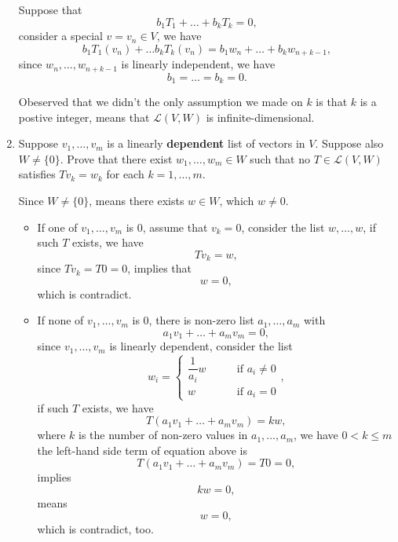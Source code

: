 \begin{enumerate}
\begin{solution}
            Suppose that 
            \[ b_1T_1 + \dots + b_kT_k = 0, \]
            consider a special $v = v_n \in V$, we have 
                \[ b_1T_1(v_n) + \dots b_kT_k(v_n) = b_1w_{n} + \dots + b_kw_{n+k-1}, \]
            since $w_{n}, \ldots, w_{n+k-1}$ is linearly independent, we have 
            \[ b_1 = \dots = b_k = 0.\]
            
            Obeserved that we didn't the only assumption we made on $k$ is that $k$ is a postive integer, means that $\mathcal{L}(V,W)$ is infinite-dimensional.
        \end{solution}
    \item Suppose $v_1, \ldots, v_m$ is a linearly \textbf{dependent} list of vectors in $V$. Suppose also $W \neq \{0\}$. Prove that there exist 
        $w_1, \ldots, w_m \in W$ such that no $T \in \mathcal{L}(V,W)$ satisfies $Tv_k = w_k$ for each $k=1,\ldots, m$.
        \begin{solution}
            Since $W \neq \{0\}$, means there exists $w \in W$, which $w \neq 0$.
            \begin{itemize}
                \item If one of $v_1, \ldots, v_m$ is $0$, assume that $v_k=0$, consider the list $w,\ldots,w$, if such $T$ exists, we have 
                    \[ Tv_k = w ,\]
                    since $Tv_k = T0 = 0$, implies that 
                    \[w = 0,\]
                    which is contradict.
                \item If none of $v_1, \ldots, v_m$ is $0$, there is non-zero list $a_1,\ldots,a_m$ with 
                    \[ a_1v_1 + \ldots + a_mv_m = 0,\]
                    since $v_1, \ldots, v_m$ is linearly dependent, consider the list 
                    \[ w_i = 
                        \begin{cases}
                            \dfrac{1}{a_i}w \qquad& \text{if $a_i \neq 0$} \\
                            w \qquad& \text{if $a_i=0$}
                        \end{cases},
                    \]
                    if such $T$ exists, we have 
                    \[ T(a_1v_1 + \dots + a_mv_m) = kw,\] 
                    where $k$ is the number of non-zero values in $a_1,\ldots,a_m$, we have $0<k\leq m$ the left-hand side term of equation above is 
                    \[ T(a_1v_1 + \dots + a_mv_m) = T0 = 0,\]
                    implies 
                    \[ kw = 0,\]
                    means 
                    \[w=0,\]
                    which is contradict, too.

\end{itemize}
\end{solution}
\end{enumerate}
